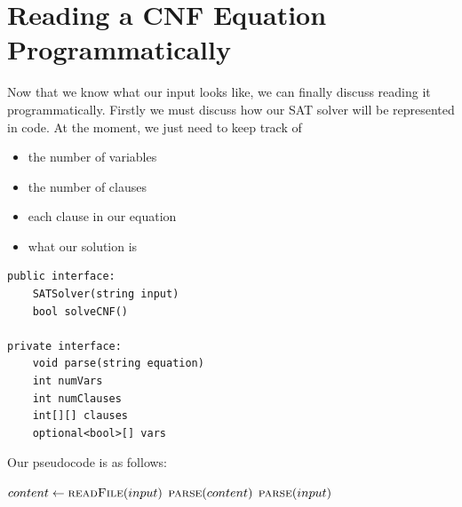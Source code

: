 \section{Reading a CNF Equation Programmatically}

Now that we know what our input looks like, we can finally discuss reading it
programmatically. Firstly we must discuss how our SAT solver will be represented
in code. At the moment, we just need to keep track of

\begin{itemize}
    \item the number of variables
    \item the number of clauses
    \item each clause in our equation
    \item what our solution is
\end{itemize}

\begin{lstlisting}
public interface:
    SATSolver(string input)
    bool solveCNF()

private interface:
    void parse(string equation)
    int numVars
    int numClauses
    int[][] clauses
    optional<bool>[] vars
\end{lstlisting}

Our pseudocode is as follows:

\begin{algorithm}[H]
\caption{SAT solver constructor}\label{alg:cap}
\begin{algorithmic}[1]
    \State $content \gets \Call{readFile}{input}$
    \State $\Call{parse}{content}$
\Else {}
    \State $\Call{parse}{input}$
\EndIf
\EndProcedure
\end{algorithmic}
\end{algorithm}

